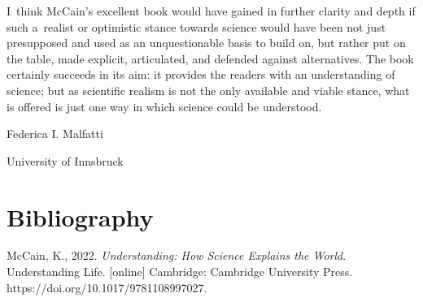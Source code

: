 I~think McCain's excellent book would have gained in further clarity and depth if such a~realist or optimistic stance towards science would have been not just presupposed and used as an unquestionable basis to build on, but rather put on the table, made explicit, articulated, and defended against alternatives. The book certainly succeeds in its aim: it provides the readers with an understanding of science; but as scientific realism is not the only available and viable stance, what is offered is just one way in which science could be understood.

Federica I. Malfatti

University of Innsbruck

\section*{Bibliography }
McCain, K., 2022. \textit{Understanding: How Science Explains the World}. Understanding Life. [online] Cambridge: Cambridge University Press. https://doi.org/10.1017/9781108997027.

